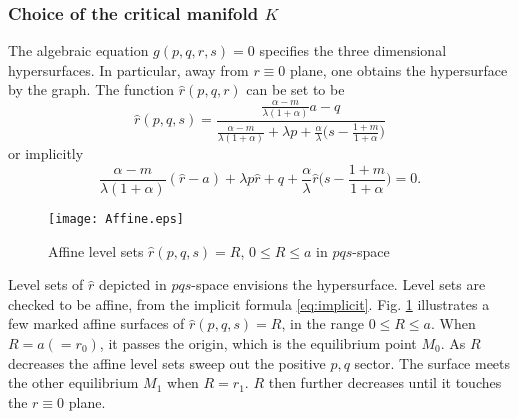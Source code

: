 \documentclass[a4paper,11pt]{article}
\theoremstyle{remark}
\begin{document}
\subsubsection{Choice of the critical manifold $K$} \label{sec:choice}
The algebraic equation $g(p,q,r,s)=0$ specifies the three dimensional hypersurfaces. In particular, away from $r\equiv0$ plane, one obtains the hypersurface by the graph. The function $\hat{r}(p,q,r)$ can be set to be
\begin{equation*}
\hat{r}(p,q,s) = \frac{ \frac{\alpha-m}{\lambda(1+\alpha)}a - q }{  \frac{\alpha-m}{\lambda(1+\alpha)} + \lambda p + \frac{\alpha}{\lambda}\big(s- \frac{1+m}{1+\alpha}\big)}
\end{equation*}
or implicitly
\begin{equation}
\frac{\alpha-m}{\lambda(1+\alpha)}(\hat{r}-a) + \lambda p\hat{r} + q +\frac{\alpha}{\lambda}\hat{r}\big(s- \frac{1+m}{1+\alpha}\big)=0. \label{eq:implicit}
\end{equation}

\begin{figure}[ht]
 \centering
%
  \texttt{[image: Affine.eps]}
  \caption{Affine level sets $\hat{r}(p,q,s)=R$, $0\le R\le a$  in $pqs$-space} \label{fig:affine}
\end{figure}

Level sets of $\hat{r}$ depicted in $pqs$-space envisions the hypersurface. Level sets are checked to be affine, from the implicit formula \eqref{eq:implicit}. Fig. \ref{fig:affine} illustrates a few marked affine surfaces of $\hat{r}(p,q,s)=R$, in the range $0\le R\le a$. When $R=a(=r_0)$, it passes the origin, which is the equilibrium point $M_0$. As $R$ decreases the affine level sets sweep out the positive $p,q$ sector. The surface meets the other equilibrium $M_1$ when $R=r_1$. $R$ then further decreases until it touches the $r\equiv0$ plane.
\end{document}

